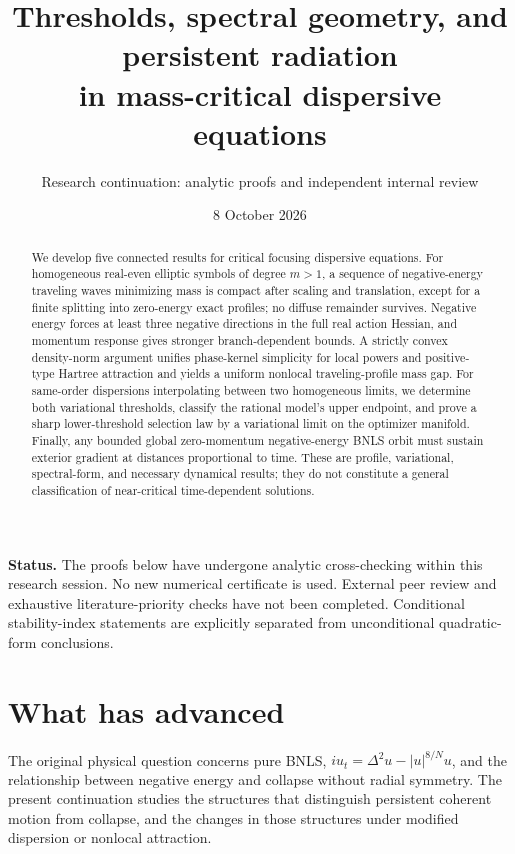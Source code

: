\documentclass[11pt,a4paper]{article}
\title{Thresholds, spectral geometry, and persistent radiation\\in mass-critical dispersive equations}
\author{Research continuation: analytic proofs and independent internal review}
\date{8 October 2026}
\theoremstyle{remark}\newtheorem{remark}[theorem]{Remark}
\begin{document}
\maketitle
\begin{abstract}
We develop five connected results for critical focusing dispersive equations.
For homogeneous real-even elliptic symbols of degree $m>1$, a sequence of
negative-energy traveling waves minimizing mass is compact after scaling
and translation, except for a finite splitting into zero-energy exact
profiles; no diffuse remainder survives. Negative energy forces at least
three negative directions in the full real action Hessian, and momentum
response gives stronger branch-dependent bounds. A strictly convex
density-norm argument unifies phase-kernel simplicity for local powers
and positive-type Hartree attraction and yields a uniform nonlocal
traveling-profile mass gap. For same-order dispersions interpolating
between two homogeneous limits, we determine both variational thresholds,
classify the rational model's upper endpoint, and prove a sharp
lower-threshold selection law by a variational limit on the optimizer
manifold. Finally, any bounded global zero-momentum negative-energy BNLS
orbit must sustain exterior gradient at distances proportional to time.
These are profile, variational, spectral-form, and necessary dynamical
results; they do not constitute a general classification of near-critical
time-dependent solutions.
\end{abstract}
\noindent\textbf{Status.} The proofs below have undergone analytic
cross-checking within this research session. No new numerical certificate
is used. External peer review and exhaustive literature-priority checks
have not been completed. Conditional stability-index statements are
explicitly separated from unconditional quadratic-form conclusions.

\section*{What has advanced}
The original physical question concerns pure BNLS,
$iu_t=\Delta^2u-|u|^{8/N}u$, and the relationship between negative
energy and collapse without radial symmetry. The present continuation
studies the structures that distinguish persistent coherent motion from
collapse, and the changes in those structures under modified dispersion
or nonlocal attraction.
\end{document}
